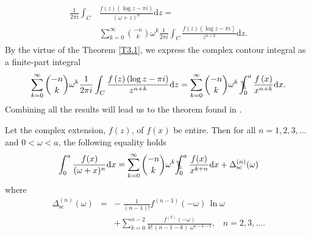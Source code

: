 \begin{align}
\begin{split}
	\frac{1}{2\pi i}\int_{C} & \frac{f\left(z\right)\left(\log z-\pi i\right)}{\left(\omega+z\right)^n} \mathrm{d}z
	 =\\& \sum_{k=0}^{\infty}{-n\choose k}\omega^{k}\frac{1}{2\pi i}\int_{C}\frac{f\left(z\right)\left(\log z-\pi i\right)}{z^{n+k}}\mathrm{d}z.
\end{split}
\end{align}
By the virtue of the Theorem \ref{T3.1}, we express the complex contour integral as a finite-part integral
\begin{equation}
	\sum_{k=0}^{\infty}{-n\choose k}\omega^{k}\frac{1}{2\pi i}\int_{C}\frac{f\left(z\right)\left(\log z-\pi i\right)}{z^{n+k}}\mathrm{d}z = \sum_{k=0}^{\infty}{-n\choose k}\omega^{k}\,\bbint{0}{a}\frac{f\left(x\right)}{x^{n+k}}\mathrm{d}x.
\end{equation} 
Combining all the results will lead us to the theorem found in \cite{tica2018finite}.
\begin{theorem} \label{T3.3}
 	Let the complex extension, $f(z)$, of $f(x)$ be entire. Then for all $n = 1, 2, 3, \dots$ and $0<\omega<a$, the following equality holds
 	\begin{equation}
 	\int_0^a \frac{f(x)}{(\omega + x)^n} \mathrm{d}x = \sum_{k=0}^{\infty} \binom{-n}{k} \omega^{ k} \bbint{0}{a} \frac{f(x)}{x^{k + n}}\mathrm{d}x + \Delta_{\mathrm{sc}}^{(n)}(\omega)
 	\end{equation}
 	where
 	\begin{eqnarray}\label{singular_terrmm}
 	\Delta_{\mathrm{sc}}^{(n)}(\omega)&=&-\;\frac{1}{\left(n-1\right)!}f^{(n-1)}\!\left(-\omega\right)\, \ln\omega \nonumber \\
 	&& + \sum_{k=0}^{n-2}\frac{f^{\left(k\right)}\left(-\omega\right)}{k!\,\left(n-1-k\right) \; \omega^{n-k-1}}, \;\;\; n=2, 3, \dots \label{main1sub}.
 	\end{eqnarray}
 \end{theorem}

